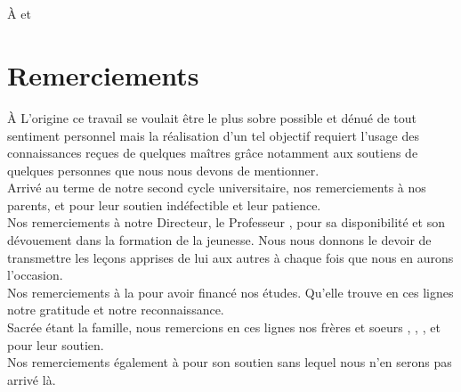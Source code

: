 \documentclass[11pt]{report}
\makeatletter
\theoremstyle{styletheorem}
\theoremstyle{styledef}
\theoremstyle{remark}
\newcommand\frontmatter{%
	\cleardoublepage
	\pagenumbering{roman}}
\makeatother
\begin{document}
 	\begin{titlepage}
 		
 	\end{titlepage}
 	
 	
 	\chapter*{}
 	
 	\thispagestyle{empty}
 	\vspace{5cm}
 	\begin{flushright}
 		À  et 
 	\end{flushright}
 	
 	\frontmatter
 	
 	\chapter*{Remerciements}
 	À L'origine ce travail se voulait être le plus sobre possible et dénué de tout sentiment personnel mais la réalisation d'un tel objectif requiert l'usage des connaissances reçues de quelques maîtres grâce notamment aux soutiens de quelques personnes que nous nous devons de mentionner.\\
 	
 	Arrivé au terme de notre second cycle universitaire, nos remerciements à nos parents,  et  pour leur soutien indéfectible et leur patience.\\
 	
 	Nos remerciements à notre Directeur, le Professeur , pour sa disponibilité et son dévouement dans la formation de la jeunesse. Nous nous donnons le devoir de transmettre les leçons apprises de lui aux autres à chaque fois que nous en aurons l'occasion.\\
 	
 	Nos remerciements à la  pour avoir financé nos études. Qu'elle trouve en ces lignes notre gratitude et notre reconnaissance.\\
 	
 	Sacrée étant la famille, nous remercions en ces lignes nos frères et soeurs , , ,  et   pour leur soutien. \\
 	Nos remerciements également à  pour son soutien sans lequel nous n'en serons pas arrivé là.\\
 	
\end{document}
